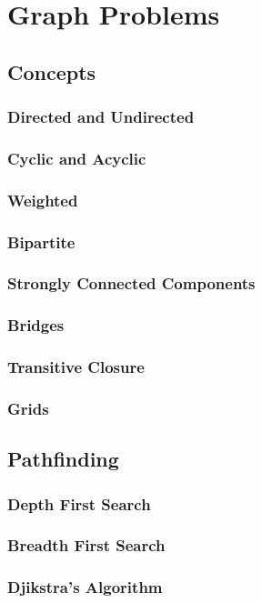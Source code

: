 \section{Graph Problems}
\subsection{Concepts}
\subsubsection{Directed and Undirected}
\subsubsection{Cyclic and Acyclic}
\subsubsection{Weighted}
\subsubsection{Bipartite}
\subsubsection{Strongly Connected Components}
\subsubsection{Bridges}
\subsubsection{Transitive Closure}
\subsubsection{Grids}
\subsection{Pathfinding}
\subsubsection{Depth First Search}
\subsubsection{Breadth First Search}
\subsubsection{Djikstra's Algorithm}
